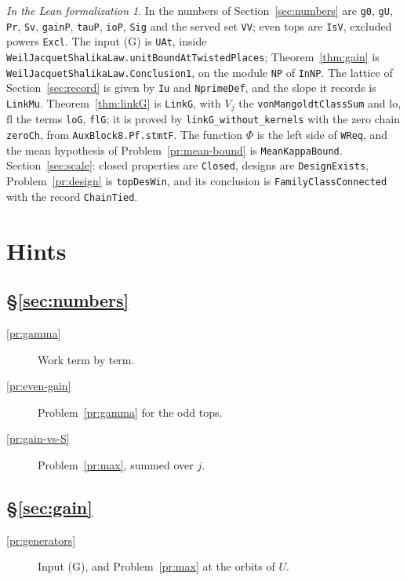 \documentclass[reqno]{amsart}
\theoremstyle{definition}
\theoremstyle{plain}
\theoremstyle{remark}
\newtheorem*{leanremark}{In the Lean formalization}
\newcommand{\tl}[1]{\texttt{#1}}
\begin{document}
\begin{leanremark}
\raggedright In \cite{Lean} the numbers of Section~\ref{sec:numbers} are \tl{g0}, \tl{gU}, \tl{Pr}, \tl{Sv}, \tl{gainP}, \tl{tauP}, \tl{ioP}, \tl{Sig} and the served set \tl{VV}; even tops are \tl{IsV}, excluded powers \tl{Excl}.  The input (G) is \tl{UAt}, inside \tl{WeilJacquetShalikaLaw.unitBoundAtTwistedPlaces}; Theorem~\ref{thm:gain} is \tl{WeilJacquetShalikaLaw.Conclusion1}, on the module \tl{NP} of \tl{InNP}.  The lattice of Section~\ref{sec:record} is given by \tl{Iu} and \tl{NprimeDef}, and the slope it records is \tl{LinkMu}.  Theorem~\ref{thm:linkG} is \tl{LinkG}, with \(V_j\) the \tl{vonMangoldtClassSum} and \(\mathrm{lo}\), \(\mathrm{fl}\) the terms \tl{loG}, \tl{flG}; it is proved by \tl{linkG\_\allowbreak{}without\_\allowbreak{}kernels} with the zero chain \tl{zeroCh}, from \tl{AuxBlock8.Pf.stmtF}.  The function \(\Phi\) is the left side of \tl{WReq}, and the mean hypothesis of Problem~\ref{pr:mean-bound} is \tl{MeanKappaBound}.  Section~\ref{sec:scale}: closed properties are \tl{Closed}, designs are \tl{DesignExists}, Problem~\ref{pr:design} is \tl{topDesWin}, and its conclusion is \tl{FamilyClassConnected} with the record \tl{ChainTied}.
\end{leanremark}

\section*{Hints}

\subsection*{\S\ref{sec:numbers}}
\begin{description}
\item[\ref{pr:gamma}] Work term by term.
\item[\ref{pr:even-gain}] Problem~\ref{pr:gamma} for the odd tops.
\item[\ref{pr:gain-vs-S}] Problem~\ref{pr:max}, summed over \(j\).
\end{description}

\subsection*{\S\ref{sec:gain}}
\begin{description}
\item[\ref{pr:generators}] Input (G), and Problem~\ref{pr:max} at the orbits of \(U\).
\end{description}
\end{document}
